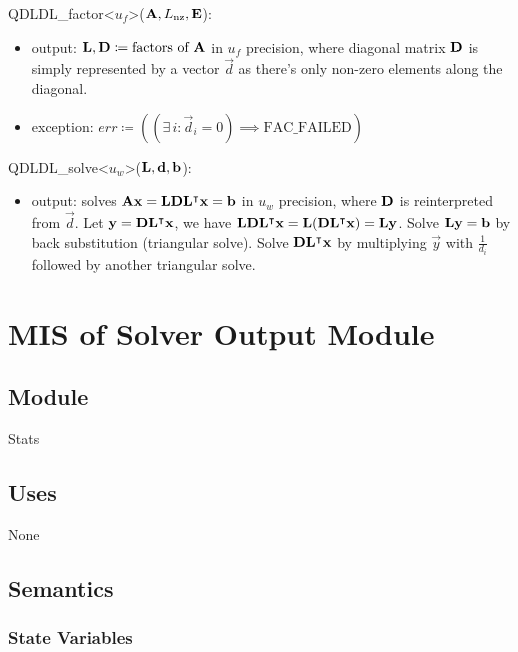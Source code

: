 \documentclass[12pt, titlepage]{article}
\begin{document}
\noindent QDLDL\_factor<\(u_f\)>(\(\mathbf{A}, L_\mathrm{nz}, \mathbf{E}\)):
\begin{itemize}
\item output: \(\mathbf{L}, \mathbf{D} \coloneq \text{factors of } \mathbf{A}\) in \(u_f\)
  precision, where diagonal matrix \(\mathbf{D}\) is simply represented by a
  vector \(\vec{d}\) as there's only non-zero elements along the diagonal.
\item exception: \(err \coloneq ((\exists\,i: \vec{d}_i = 0) \implies \text{FAC\_FAILED})\)
\end{itemize}

\noindent QDLDL\_solve<\(u_w\)>(\(\mathbf{L}, \mathbf{d}, \mathbf{b}\)):
\begin{itemize}
\item output: solves \(\mathbf{A}\mathbf{x} = \mathbf{L}\mathbf{D}\mathbf{L}^\intercal{} \mathbf{x} = \mathbf{b}
  \) in \(u_w\) precision, where \(\mathbf{D}\) is reinterpreted from \(\vec{d}\).
  Let \(\mathbf{y} = \mathbf{D}\mathbf{L}^\intercal{} \mathbf{x}\), we have
  \(\mathbf{L}\mathbf{D}\mathbf{L}^\intercal{} \mathbf{x} = \mathbf{L}
  (\mathbf{D}\mathbf{L}^\intercal{} \mathbf{x}) = \mathbf{L}\mathbf{y}\). Solve
  \(\mathbf{L}\mathbf{y} = \mathbf{b}\) by back substitution (triangular solve). Solve
  \(\mathbf{D}\mathbf{L}^\intercal{} \mathbf{x}\) by multiplying \(\vec{y}\) with
  \(\frac{1}{d_i}\) followed by another triangular solve.
\end{itemize}

\newpage

\section{MIS of Solver Output Module} \label{M:output}

\subsection{Module}

Stats

\subsection{Uses}

None


\subsection{Semantics}

\subsubsection{State Variables}
\end{document}
